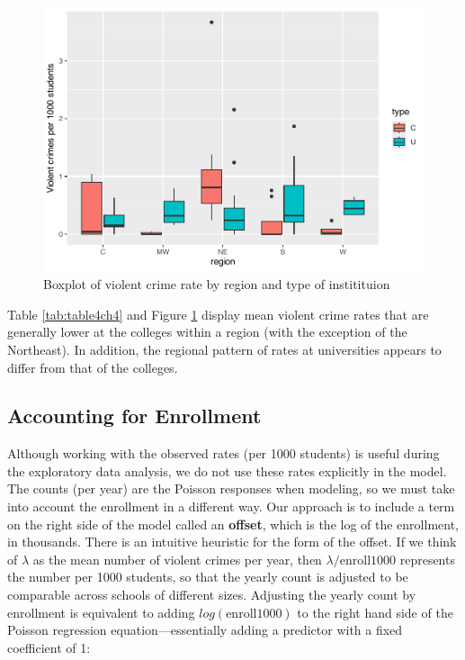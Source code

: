 \documentclass[
]{krantz}
\begin{document}
\begin{figure}

{\centering \includegraphics[width=0.6\linewidth]{bookdown-BeyondMLR_files/figure-latex/boxtyperegion-1} 

}

\caption{Boxplot of violent crime rate by region and type of institituion}\label{fig:boxtyperegion}
\end{figure}

Table \ref{tab:table4ch4} and Figure \ref{fig:boxtyperegion} display mean violent crime rates that are generally lower at the colleges within a region (with the exception of the Northeast). In addition, the regional pattern of rates at universities appears to differ from that of the colleges.

\hypertarget{accounting-for-enrollment}{%
\subsection{Accounting for Enrollment}\label{accounting-for-enrollment}}

Although working with the observed rates (per 1000 students) is useful during the exploratory data analysis, we do not use these rates explicitly in the model. The counts (per year) are the Poisson responses when modeling, so we must take into account the enrollment in a different way. Our approach is to include a term on the right side of the model called an \textbf{offset},  which is the log of the enrollment, in thousands. There is an intuitive heuristic for the form of the offset. If we think of \(\lambda\) as the mean number of violent crimes per year, then \(\lambda/\textrm{enroll1000}\) represents the number per 1000 students, so that the yearly count is adjusted to be comparable across schools of different sizes. Adjusting the yearly count by enrollment is equivalent to adding \(log(\textrm{enroll1000})\) to the right hand side of the Poisson regression equation---essentially adding a predictor with a fixed coefficient of 1:
\end{document}
